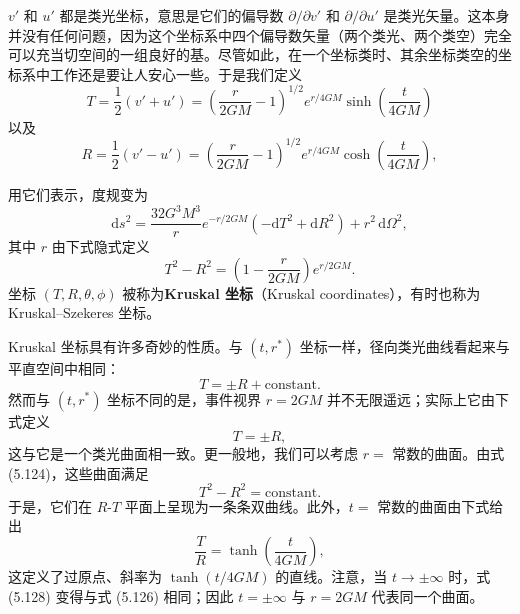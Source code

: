 $v'$ 和 $u'$ 都是类光坐标，意思是它们的偏导数 $\partial/\partial v'$ 和 $\partial/\partial u'$ 是类光矢量。这本身并没有任何问题，因为这个坐标系中四个偏导数矢量（两个类光、两个类空）完全可以充当切空间的一组良好的基。尽管如此，在一个坐标类时、其余坐标类空的坐标系中工作还是要让人安心一些。于是我们定义
\begin{equation*}
T = \frac{1}{2}(v' + u') = \left(\frac{r}{2GM} - 1\right)^{1/2}e^{r/4GM}\sinh\left(\frac{t}{4GM}\right)
\tag{5.121}
\end{equation*}
以及
\begin{equation*}
R = \frac{1}{2}(v' - u') = \left(\frac{r}{2GM} - 1\right)^{1/2}e^{r/4GM}\cosh\left(\frac{t}{4GM}\right),
\tag{5.122}
\end{equation*}

用它们表示，度规变为
\begin{equation*}
\boxed{\,\mathrm{d}s^2 = \frac{32G^3M^3}{r}e^{-r/2GM}\left(-\mathrm{d}T^2 + \mathrm{d}R^2\right) + r^2\,\mathrm{d}\Omega^2,\,}
\tag{5.123}
\end{equation*}
其中 $r$ 由下式隐式定义
\begin{equation*}
T^2 - R^2 = \left(1 - \frac{r}{2GM}\right)e^{r/2GM}.
\tag{5.124}
\end{equation*}
坐标 $(T, R, \theta, \phi)$ 被称为\textbf{Kruskal 坐标}（Kruskal coordinates），有时也称为 Kruskal--Szekeres 坐标。

Kruskal 坐标具有许多奇妙的性质。与 $(t, r^*)$ 坐标一样，径向类光曲线看起来与平直空间中相同：
\begin{equation*}
T = \pm R + \text{constant}.
\tag{5.125}
\end{equation*}
然而与 $(t, r^*)$ 坐标不同的是，事件视界 $r = 2GM$ 并不无限遥远；实际上它由下式定义
\begin{equation*}
T = \pm R,
\tag{5.126}
\end{equation*}
这与它是一个类光曲面相一致。更一般地，我们可以考虑 $r =$ 常数的曲面。由式 (5.124)，这些曲面满足
\begin{equation*}
T^2 - R^2 = \text{constant}.
\tag{5.127}
\end{equation*}
于是，它们在 $R$-$T$ 平面上呈现为一条条双曲线。此外，$t =$ 常数的曲面由下式给出
\begin{equation*}
\frac{T}{R} = \tanh\left(\frac{t}{4GM}\right),
\tag{5.128}
\end{equation*}
这定义了过原点、斜率为 $\tanh(t/4GM)$ 的直线。注意，当 $t \to \pm\infty$ 时，式 (5.128) 变得与式 (5.126) 相同；因此 $t = \pm\infty$ 与 $r = 2GM$ 代表同一个曲面。

